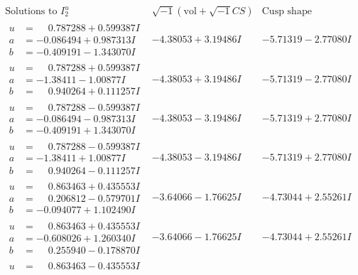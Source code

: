 \documentclass[1p]{elsarticle_modified}
\theoremstyle{definition}
\newcommand{\I}{\sqrt{-1}}
\begin{document}
$$\begin{array}{c|c|c}  
\text{Solutions to }I^u_{2}& \I (\text{vol} + \sqrt{-1}CS) & \text{Cusp shape}\\
 \hline 
\begin{aligned}
u &= \phantom{-}0.787288 + 0.599387 I \\
a &= -0.086494 + 0.987313 I \\
b &= -0.409191 - 1.343070 I\end{aligned}
 & -4.38053 + 3.19486 I & -5.71319 - 2.77080 I \\ \hline\begin{aligned}
u &= \phantom{-}0.787288 + 0.599387 I \\
a &= -1.38411 - 1.00877 I \\
b &= \phantom{-}0.940264 + 0.111257 I\end{aligned}
 & -4.38053 + 3.19486 I & -5.71319 - 2.77080 I \\ \hline\begin{aligned}
u &= \phantom{-}0.787288 - 0.599387 I \\
a &= -0.086494 - 0.987313 I \\
b &= -0.409191 + 1.343070 I\end{aligned}
 & -4.38053 - 3.19486 I & -5.71319 + 2.77080 I \\ \hline\begin{aligned}
u &= \phantom{-}0.787288 - 0.599387 I \\
a &= -1.38411 + 1.00877 I \\
b &= \phantom{-}0.940264 - 0.111257 I\end{aligned}
 & -4.38053 - 3.19486 I & -5.71319 + 2.77080 I \\ \hline\begin{aligned}
u &= \phantom{-}0.863463 + 0.435553 I \\
a &= \phantom{-}0.206812 - 0.579701 I \\
b &= -0.094077 + 1.102490 I\end{aligned}
 & -3.64066 - 1.76625 I & -4.73044 + 2.55261 I \\ \hline\begin{aligned}
u &= \phantom{-}0.863463 + 0.435553 I \\
a &= -0.608026 + 1.260340 I \\
b &= \phantom{-}0.255940 - 0.178870 I\end{aligned}
 & -3.64066 - 1.76625 I & -4.73044 + 2.55261 I \\ \hline\begin{aligned}
u &= \phantom{-}0.863463 - 0.435553 I \\

\end{aligned}
\end{array}$$
\end{document}
